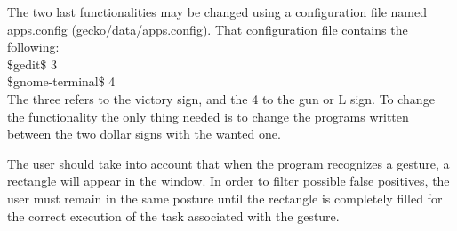 The two last functionalities may be changed using a configuration file named apps.config (gecko/data/apps.config). 
That configuration file contains the following:
\\[0.5cm]
\$gedit\$ 3 \\
\$gnome-terminal\$ 4
\\[0.5cm]
The three refers to the victory sign, and the 4 to the gun or L sign. To change the functionality the only thing needed is to change the programs written between the two dollar signs with the wanted one. 

The user should take into account that when the program recognizes a gesture, a rectangle will appear in the window. In order to filter possible false positives, the user must remain in the same posture until the rectangle is completely filled for the correct execution of the task associated with the gesture. 


\newpage
